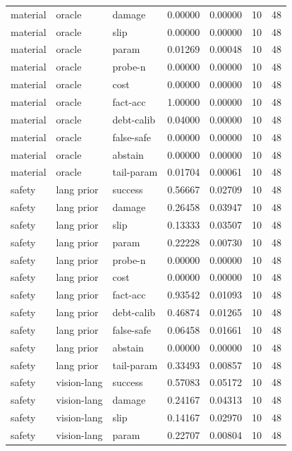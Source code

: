 \documentclass{article}
\begin{document}
\begin{center}
\begin{longtable}{lllllll}
material & oracle & damage & 0.00000 & 0.00000 & 10 & 48 \\
material & oracle & slip & 0.00000 & 0.00000 & 10 & 48 \\
material & oracle & param & 0.01269 & 0.00048 & 10 & 48 \\
material & oracle & probe-n & 0.00000 & 0.00000 & 10 & 48 \\
material & oracle & cost & 0.00000 & 0.00000 & 10 & 48 \\
material & oracle & fact-acc & 1.00000 & 0.00000 & 10 & 48 \\
material & oracle & debt-calib & 0.04000 & 0.00000 & 10 & 48 \\
material & oracle & false-safe & 0.00000 & 0.00000 & 10 & 48 \\
material & oracle & abstain & 0.00000 & 0.00000 & 10 & 48 \\
material & oracle & tail-param & 0.01704 & 0.00061 & 10 & 48 \\
safety & lang prior & success & 0.56667 & 0.02709 & 10 & 48 \\
safety & lang prior & damage & 0.26458 & 0.03947 & 10 & 48 \\
safety & lang prior & slip & 0.13333 & 0.03507 & 10 & 48 \\
safety & lang prior & param & 0.22228 & 0.00730 & 10 & 48 \\
safety & lang prior & probe-n & 0.00000 & 0.00000 & 10 & 48 \\
safety & lang prior & cost & 0.00000 & 0.00000 & 10 & 48 \\
safety & lang prior & fact-acc & 0.93542 & 0.01093 & 10 & 48 \\
safety & lang prior & debt-calib & 0.46874 & 0.01265 & 10 & 48 \\
safety & lang prior & false-safe & 0.06458 & 0.01661 & 10 & 48 \\
safety & lang prior & abstain & 0.00000 & 0.00000 & 10 & 48 \\
safety & lang prior & tail-param & 0.33493 & 0.00857 & 10 & 48 \\
safety & vision-lang & success & 0.57083 & 0.05172 & 10 & 48 \\
safety & vision-lang & damage & 0.24167 & 0.04313 & 10 & 48 \\
safety & vision-lang & slip & 0.14167 & 0.02970 & 10 & 48 \\
safety & vision-lang & param & 0.22707 & 0.00804 & 10 & 48 \\
\bottomrule
\end{longtable}
\renewcommand{\arraystretch}{1.0}
\end{center}
\end{document}
